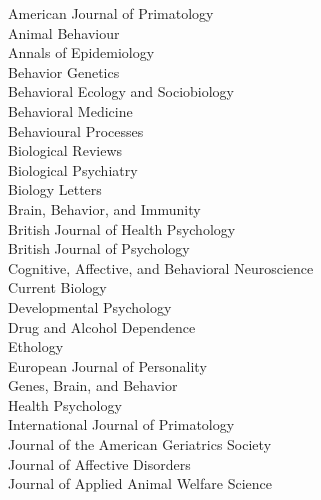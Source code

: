 \documentclass[11pt]{article}
\begin{document}
\begin{minipage}[t]{0.49\linewidth}
American Journal of Primatology \\
Animal Behaviour \\
Annals of Epidemiology \\
Behavior Genetics \\
Behavioral Ecology and Sociobiology \\
Behavioral Medicine \\
Behavioural Processes \\
Biological Reviews \\
Biological Psychiatry \\
Biology Letters \\
Brain, Behavior, and Immunity \\
British Journal of Health Psychology \\
British Journal of Psychology \\
Cognitive, Affective, and Behavioral Neuroscience \\
Current Biology \\
Developmental Psychology \\
Drug and Alcohol Dependence \\
Ethology \\
European Journal of Personality \\
Genes, Brain, and Behavior \\
Health Psychology \\
International Journal of Primatology \\
Journal of the American Geriatrics Society \\
Journal of Affective Disorders \\
Journal of Applied Animal Welfare Science

\end{minipage}
\hfill
\end{document}
